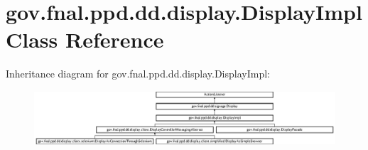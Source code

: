 \hypertarget{classgov_1_1fnal_1_1ppd_1_1dd_1_1display_1_1DisplayImpl}{\section{gov.\-fnal.\-ppd.\-dd.\-display.\-Display\-Impl Class Reference}
\label{classgov_1_1fnal_1_1ppd_1_1dd_1_1display_1_1DisplayImpl}
}
Inheritance diagram for gov.\-fnal.\-ppd.\-dd.\-display.\-Display\-Impl\-:\begin{figure}[H]
\begin{center}
\leavevmode
\includegraphics[height=2.015839cm]{classgov_1_1fnal_1_1ppd_1_1dd_1_1display_1_1DisplayImpl}
\end{center}
\end{figure}

